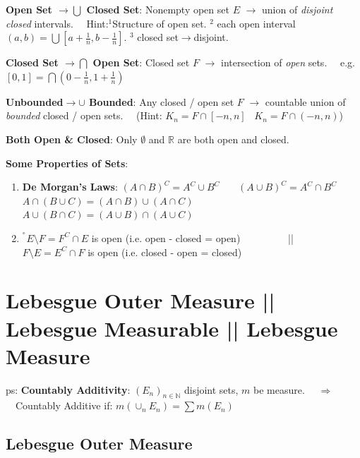 \documentclass[9pt]{article}
\newcommand{\ex}{{\tiny $^{^{^\oplus}}$}}
\begin{document}
\textbf{Open Set $\to\bigcup$ Closed Set}: {\small Nonempty open set $E$ $\to$ union of \textit{disjoint closed} intervals.} \ \ {\tiny Hint:$^1$Structure of open set. $^2$ each open interval $(a,b)=\bigcup[a+\frac{1}{n},b-\frac{1}{n}]$. $^3$ closed set$\to$disjoint.}

\textbf{Closed Set $\to\bigcap$ Open Set}: {\small Closed set $F$ $\to$ intersection of \textit{open} sets.} \ \ {\tiny e.g. $[0,1]=\bigcap(0-\frac{1}{n},1+\frac{1}{n})$}

\textbf{Unbounded$\to\cup$ Bounded}: Any closed / open set $F$ $\to$ countable union of \textit{bounded} closed / open sets. \ \ {\tiny (Hint: $K_n=F\cap[-n,n]$ \ $K_n=F\cap(-n,n)$)}

\textbf{Both Open \& Closed}: Only $\emptyset$ and $\mathbb{R}$ are both open and closed.

\textbf{Some Properties of Sets}:

\begin{enumerate}[itemsep=-2pt, topsep=-2pt]
    \item \textbf{De Morgan's Laws}: $(A\cap B)^C=A^C\cup B^C$ \ \ \ $(A\cup B)^C=A^C\cap B^C$ \qquad \qquad $A\cap(B\cup C)=(A\cap B)\cup(A\cap C)$ \ \ \ $A\cup(B\cap C)=(A\cup B)\cap(A\cup C)$
    \item \ex$E \setminus F=F^C\cap E$ is open {\footnotesize (i.e. open - closed = open)} \ \ \ \ \ \ \ \ \ || \ \ \ \ \ \ \ \ \ $F\setminus E=E^C\cap F$ is open {\footnotesize (i.e. closed - open = closed)}
\end{enumerate}


\section{Lebesgue Outer Measure || Lebesgue Measurable || Lebesgue Measure}

\qquad ps: \textbf{Countably Additivity}: $(E_n)_{n\in\mathbb{N}}$ disjoint sets, $m$ be measure. \ \ $\Rightarrow$ \ \ Countably Additive if: $m(\cup_{n}E_n)=\sum m(E_n)$


\subsection{Lebesgue Outer Measure}
\end{document}
